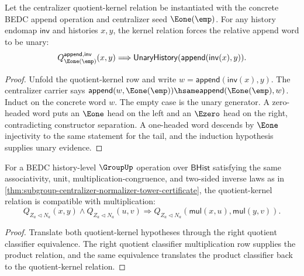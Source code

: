 \begin{theorem}
\label{thm:subgroup-centralizer-quotient-kernel-append-e1-unit-kernel-unary}
Let the centralizer quotient-kernel relation be instantiated with the concrete
BEDC append operation and centralizer seed $\Eone(\emp)$. For any history
endomap $\mathsf{inv}$ and histories $x,y$, the kernel relation forces the
relative append word to be unary:
$$
Q_{\Eone(\emp)}^{\mathsf{append},\mathsf{inv}}(x,y)
\Longrightarrow
\mathsf{UnaryHistory}(\mathsf{append}(\mathsf{inv}(x),y)).
$$
\end{theorem}
\begin{proof}
Unfold the quotient-kernel row and write
$w=\mathsf{append}(\mathsf{inv}(x),y)$. The centralizer carrier says
$\mathsf{append}(w,\Eone(\emp))\hsame
\mathsf{append}(\Eone(\emp),w)$. Induct on the concrete word $w$. The empty
case is the unary generator. A zero-headed word puts an $\Eone$ head on the
left and an $\Ezero$ head on the right, contradicting constructor separation.
A one-headed word descends by $\Eone$ injectivity to the same statement for the
tail, and the induction hypothesis supplies unary evidence.
\end{proof}

\begin{theorem}
\label{thm:subgroup-centralizer-quotient-kernel-mul-compatible}
For a BEDC history-level $\GroupUp$ operation over $\mathsf{BHist}$ satisfying
the same associativity, unit, multiplication-congruence, and two-sided inverse
laws as in
\autoref{thm:subgroup-centralizer-normalizer-tower-certificate}, the
quotient-kernel relation is compatible with multiplication:
$$
Q_{Z_a\triangleleft N_a}(x,y)\land Q_{Z_a\triangleleft N_a}(u,v)
\Longrightarrow
Q_{Z_a\triangleleft N_a}(\mathsf{mul}(x,u),\mathsf{mul}(y,v)).
$$
\end{theorem}
\begin{proof}
Translate both quotient-kernel hypotheses through the right quotient
classifier equivalence. The right quotient classifier multiplication row
supplies the product relation, and the same equivalence translates the product
classifier back to the quotient-kernel relation.
\end{proof}

